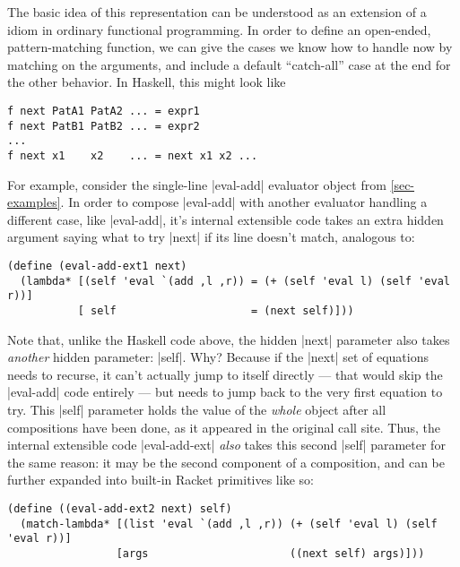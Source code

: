 The basic idea of this representation can be understood as an extension of a idiom in ordinary functional programming.
In order to define an open-ended, pattern-matching function, we can give the cases we know how to handle now by matching on the arguments, and include a default ``catch-all'' case at the end for the other behavior.
In Haskell, this might look like
\begin{verbatim}
f next PatA1 PatA2 ... = expr1
f next PatB1 PatB2 ... = expr2
...
f next x1    x2    ... = next x1 x2 ...
\end{verbatim}

For example, consider the single-line \scm|eval-add| evaluator object from \cref{sec-examples}.
In order to compose \scm|eval-add| with another evaluator handling a different case, like \scm|eval-add|, it's internal extensible code takes an extra hidden argument saying what to try \scm|next| if its line doesn't match, analogous to:
\begin{verbatim}
(define (eval-add-ext1 next)
  (lambda* [(self 'eval `(add ,l ,r)) = (+ (self 'eval l) (self 'eval r))]
           [ self                     = (next self)]))
\end{verbatim}
Note that, unlike the Haskell code above, the hidden \scm|next| parameter also takes \emph{another} hidden parameter: \scm|self|.
Why?
Because if the \scm|next| set of equations needs to recurse, it can't actually jump to itself directly --- that would skip the \scm|eval-add| code entirely --- but needs to jump back to the very first equation to try.
This \scm|self| parameter holds the value of the \emph{whole} object after all compositions have been done, as it appeared in the original call site.
Thus, the internal extensible code \scm|eval-add-ext| \emph{also} takes this second \scm|self| parameter for the same reason: it may be the second component of a composition, and can be further expanded into built-in Racket primitives like so:
\begin{verbatim}
(define ((eval-add-ext2 next) self)
  (match-lambda* [(list 'eval `(add ,l ,r)) (+ (self 'eval l) (self 'eval r))]
                 [args                      ((next self) args)]))
\end{verbatim}

